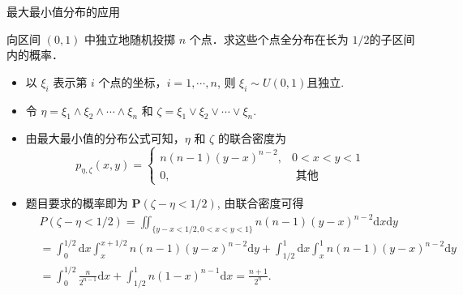 \documentclass[Prob-All.tex]{subfiles}
\begin{document}
\begin{frame}{最大最小值分布的应用}
\begin{exam}
向区间 $(0,1)$ 中独立地随机投掷 $n$ 个点．求这些个点全分布在长为 $1 / 2$的子区间内的概率．
\end{exam}

\pause


\begin{itemize}[<+-|alert@+>]
\item 以 $\xi_{i}$ 表示第 $i$ 个点的坐标，$i=1,\cdots, n$, 则 $\xi_i\sim U(0,1)$且独立.
\item 令 $\eta=\xi_{1} \wedge \xi_{2} \wedge \cdots \wedge \xi_{n}$ 和 $\zeta=\xi_{1} \vee \xi_{2} \vee \cdots \vee \xi_{n}$.
\item 由最大最小值的分布公式可知，$\eta$ 和 $\zeta$ 的联合密度为
\[p_{\eta, \zeta}(x, y)=\left\{\begin{array}{lc} n(n-1)(y-x)^{n-2}, & 0<x<y<1 \\ 0, & \text { 其他 } \end{array}\right.\]
\item 题目要求的概率即为 $\mathbf{P}(\zeta-\eta<1 / 2)$, 由联合密度可得
{\small \begin{align*}
   &P(\zeta-\eta<1 / 2) =\iint_{\{y-x<1 / 2,0<x<y<1\}} n(n-1)(y-x)^{n-2} \mathrm{d} x \mathrm{d} y \\
   &=\int_{0}^{1 / 2} \mathrm{d} x \int_{x}^{x+1 / 2} n(n-1)(y-x)^{n-2} \mathrm{d} y+ \int_{1 / 2}^{1} \mathrm{d} x \int_{x}^{1} n(n-1)(y-x)^{n-2} \mathrm{d} y \\
   &=  \int_{0}^{1 / 2} \frac{n}{2^{n-1}} \mathrm{d} x+\int_{1 / 2}^{1} n(1-x)^{n-1} \mathrm{d} x=\frac{n+1}{2^{n}}.
\end{align*}}
\end{itemize}



\end{frame}
\end{document}
